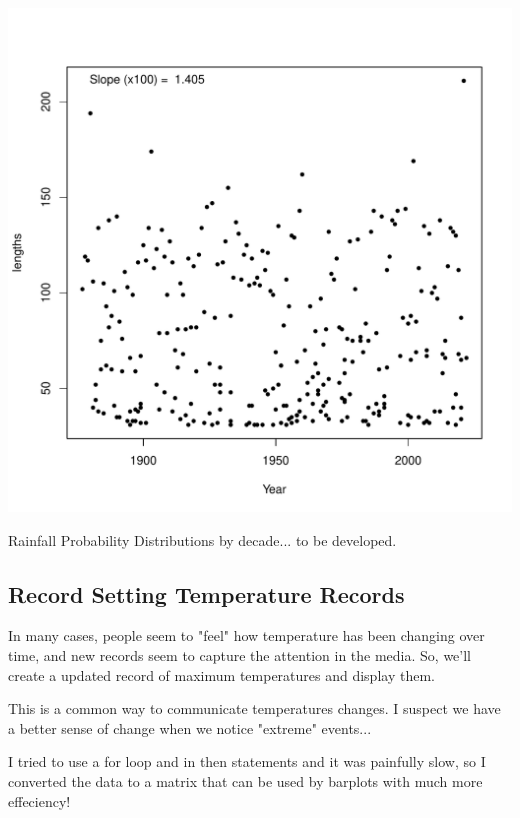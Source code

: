 \documentclass{article}
\begin{document}
\begin{knitrout}
\begin{kframe}
{\ttfamily\noindent\bfseries\color{errorcolor}{\#\# Error in is.data.frame(data): object 'Drought.run.100' not found}}\end{kframe}
\includegraphics[width=\maxwidth]{figure/unnamed-chunk-11-2} 
\end{knitrout}

Rainfall Probability Distributions by decade... to be developed.





\subsection{Record Setting Temperature Records}

In many cases, people seem to "feel" how temperature has been changing over time, and new records seem to capture the attention in the media. So, we'll create a updated record of maximum temperatures and display them. 





This is a common way to communicate temperatures changes. I suspect we have a better sense of change when we notice "extreme" events...






I tried to use a for loop and in then statements and it was painfully slow, so I converted the data to a matrix that can be used by barplots with much more effeciency!
\end{document}
